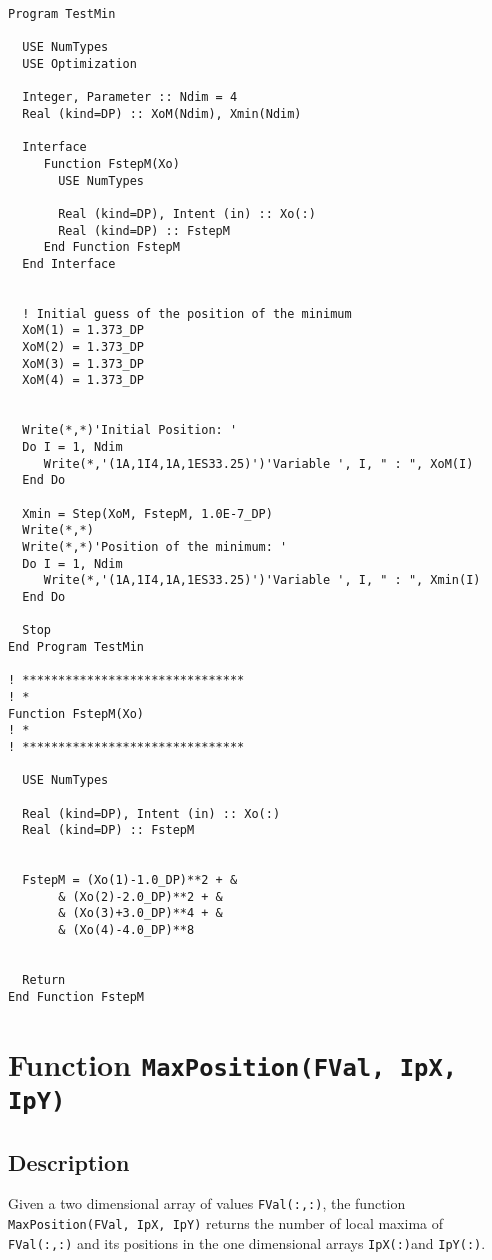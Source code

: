 \begin{lstlisting}[emph=Step,
                   emphstyle=\color{blue},
                   frame=trBL,
                   caption=Minimising a function.,
                   label=step]
Program TestMin

  USE NumTypes
  USE Optimization

  Integer, Parameter :: Ndim = 4
  Real (kind=DP) :: XoM(Ndim), Xmin(Ndim)
  
  Interface
     Function FstepM(Xo)
       USE NumTypes
       
       Real (kind=DP), Intent (in) :: Xo(:)
       Real (kind=DP) :: FstepM
     End Function FstepM
  End Interface
  

  ! Initial guess of the position of the minimum
  XoM(1) = 1.373_DP
  XoM(2) = 1.373_DP
  XoM(3) = 1.373_DP
  XoM(4) = 1.373_DP
  

  Write(*,*)'Initial Position: '
  Do I = 1, Ndim
     Write(*,'(1A,1I4,1A,1ES33.25)')'Variable ', I, " : ", XoM(I)
  End Do
  
  Xmin = Step(XoM, FstepM, 1.0E-7_DP)
  Write(*,*)
  Write(*,*)'Position of the minimum: '
  Do I = 1, Ndim
     Write(*,'(1A,1I4,1A,1ES33.25)')'Variable ', I, " : ", Xmin(I)
  End Do

  Stop
End Program TestMin

! *******************************
! *
Function FstepM(Xo)
! *
! *******************************

  USE NumTypes
  
  Real (kind=DP), Intent (in) :: Xo(:)
  Real (kind=DP) :: FstepM

  
  FstepM = (Xo(1)-1.0_DP)**2 + &
       & (Xo(2)-2.0_DP)**2 + &
       & (Xo(3)+3.0_DP)**4 + &
       & (Xo(4)-4.0_DP)**8 


  Return
End Function FstepM
\end{lstlisting}

\section{Function \texttt{MaxPosition(FVal, IpX, IpY) }}

\subsection{Description}

Given a two dimensional array of values \texttt{FVal(:,:)}, the
function \texttt{MaxPosition(FVal, IpX, IpY)} returns the number of
local maxima of \texttt{FVal(:,:)} and its positions in the one
dimensional arrays \texttt{IpX(:)}and \texttt{IpY(:)}.

